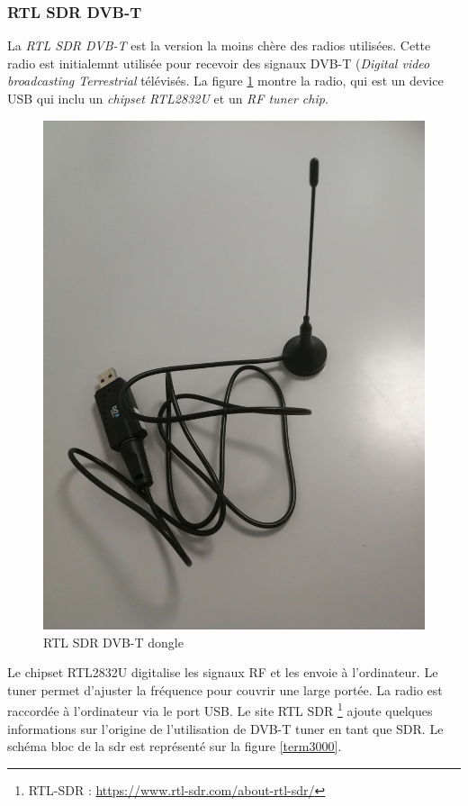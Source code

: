 \newpage

\subsubsection{RTL SDR DVB-T}\label{dvbt}

La \textit{RTL SDR DVB-T} est la version la moins chère des radios utilisées. Cette radio est initialemnt utilisée pour recevoir des signaux DVB-T (\textit{Digital video broadcasting Terrestrial} télévisés. La figure \ref{term31} montre la radio, qui est un device USB qui inclu un \textit{chipset RTL2832U} et un \textit{RF tuner chip}.

\begin{figure}[h]
\centering

\includegraphics[scale=0.08]{images/dvbt.png}
\caption{RTL SDR DVB-T dongle}\label{term31}
\end{figure}

Le chipset RTL2832U digitalise les signaux RF et les envoie à l'ordinateur. Le tuner permet d'ajuster la fréquence pour couvrir une large portée.
La radio est raccordée à l'ordinateur via le port USB. Le site RTL SDR \footnote{RTL-SDR : \href{https://www.rtl-sdr.com/about-rtl-sdr/}{https://www.rtl-sdr.com/about-rtl-sdr/}} ajoute quelques informations sur l'origine de l'utilisation de DVB-T tuner en tant que SDR. Le schéma bloc de la sdr est représenté sur la figure \ref{term3000}. 

